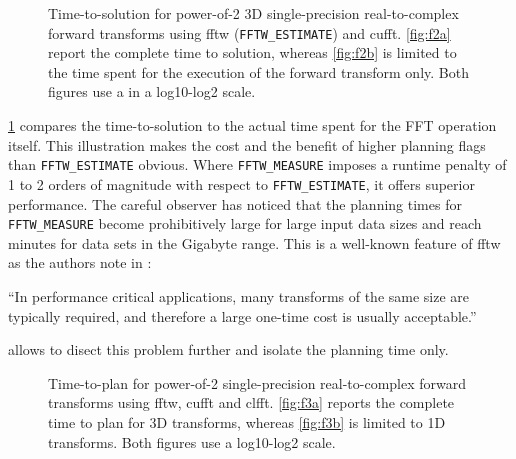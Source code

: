\begin{figure}[!tbp]
  \centering
  \def\svgwidth{0.95\columnwidth}
  
  \def\svgwidth{0.45\columnwidth}
  \subfloat[Fig A.]{\label{fig:f2a}}
  \hfill
  \def\svgwidth{0.45\columnwidth}
  \subfloat[Fig B.]{\label{fig:f2b}}
  \caption{Time-to-solution for power-of-2 3D single-precision real-to-complex forward transforms using fftw (\texttt{FFTW\_ESTIMATE}) and cufft. \cref{fig:f2a} report the complete time to solution, whereas \cref{fig:f2b} is limited to the time spent for the execution of the forward transform only. Both figures use a in a log10-log2 scale.}
  \label{fig:fftw_plan_flags}
\end{figure}

\cref{fig:fftw_plan_flags} compares the time-to-solution to the actual time spent for the FFT operation itself. This illustration makes the cost and the benefit of higher planning flags than \texttt{FFTW\_ESTIMATE} obvious. Where \texttt{FFTW\_MEASURE} imposes a runtime penalty of 1 to 2 orders of magnitude with respect to \texttt{FFTW\_ESTIMATE}, it offers superior performance. The careful observer has noticed that the planning times for \texttt{FFTW\_MEASURE} become prohibitively large for large input data sizes and reach minutes for data sets in the Gigabyte range. This is a well-known feature of fftw as the authors note in \cite{FFTW05}:

\begin{center}
  ``In performance critical applications, many transforms of the same
  size are typically required, and therefore a large one-time cost is
  usually acceptable.''
\end{center}
 
\gearshifft{} allows to disect this problem further and isolate the planning time only.

\begin{figure}[!tbp]
  \centering
  \def\svgwidth{0.45\columnwidth}
  \subfloat[Fig A.]{\label{fig:f3a}}
  \hfill
  \def\svgwidth{0.45\columnwidth}
  \subfloat[Fig B.]{\label{fig:f3b}}
  \caption{Time-to-plan for power-of-2 single-precision real-to-complex forward transforms using fftw, cufft and clfft. \cref{fig:f3a} reports the complete time to plan for 3D transforms, whereas \cref{fig:f3b} is limited to 1D transforms. Both figures use a log10-log2 scale.}
  \label{fig:plan_time_only}
\end{figure}


